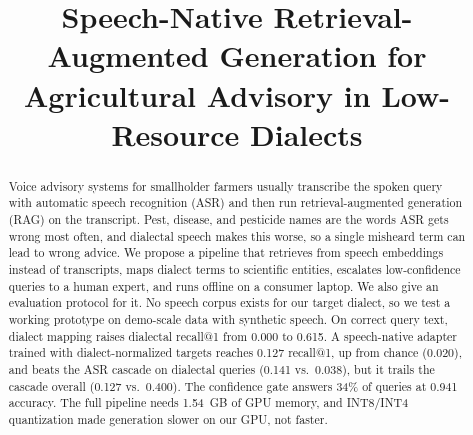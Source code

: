 \documentclass[conference]{IEEEtran}
\begin{document}
\raggedbottom

\title{Speech-Native Retrieval-Augmented Generation for Agricultural Advisory in Low-Resource Dialects}

\author{
\and
{}
\and
{}
}

\maketitle

\begin{abstract}
Voice advisory systems for smallholder farmers usually transcribe the spoken query with automatic speech recognition (ASR) and then run retrieval-augmented generation (RAG) on the transcript. Pest, disease, and pesticide names are the words ASR gets wrong most often, and dialectal speech makes this worse, so a single misheard term can lead to wrong advice. We propose a pipeline that retrieves from speech embeddings instead of transcripts, maps dialect terms to scientific entities, escalates low-confidence queries to a human expert, and runs offline on a consumer laptop. We also give an evaluation protocol for it. No speech corpus exists for our target dialect, so we test a working prototype on demo-scale data with synthetic speech. On correct query text, dialect mapping raises dialectal recall@1 from 0.000 to 0.615. A speech-native adapter trained with dialect-normalized targets reaches 0.127 recall@1, up from chance (0.020), and beats the ASR cascade on dialectal queries (0.141 vs.\ 0.038), but it trails the cascade overall (0.127 vs.\ 0.400). The confidence gate answers 34\% of queries at 0.941 accuracy. The full pipeline needs 1.54~GB of GPU memory, and INT8/INT4 quantization made generation slower on our GPU, not faster.
\end{abstract}
\end{document}
